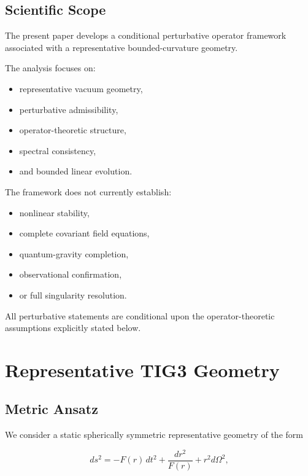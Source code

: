 \subsection{Scientific Scope}

The present paper develops a conditional perturbative operator framework associated with a representative bounded-curvature geometry.

The analysis focuses on:
\begin{itemize}[leftmargin=0.6cm]
\item representative vacuum geometry,
\item perturbative admissibility,
\item operator-theoretic structure,
\item spectral consistency,
\item and bounded linear evolution.
\end{itemize}

The framework does not currently establish:
\begin{itemize}[leftmargin=0.6cm]
\item nonlinear stability,
\item complete covariant field equations,
\item quantum-gravity completion,
\item observational confirmation,
\item or full singularity resolution.
\end{itemize}

All perturbative statements are conditional upon the operator-theoretic assumptions explicitly stated below.


\section{Representative TIG3 Geometry}

\subsection{Metric Ansatz}

We consider a static spherically symmetric representative geometry of the form

\begin{equation}
ds^2
=
-F(r)\,dt^2
+
\frac{dr^2}{F(r)}
+
r^2 d\Omega^2,
\end{equation}

